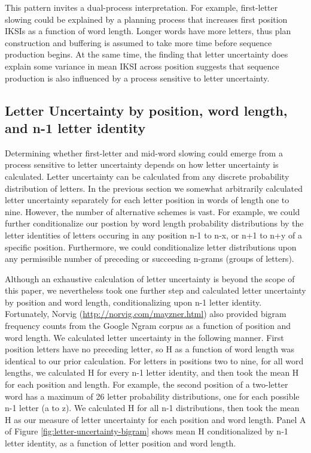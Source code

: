 \documentclass[floatsintext,man]{apa6}
\theoremstyle{definition}
\theoremstyle{definition}
\theoremstyle{definition}
\theoremstyle{remark}
\begin{document}
This pattern invites a dual-process interpretation. For example,
first-letter slowing could be explained by a planning process that
increases first position IKSIs as a function of word length. Longer
words have more letters, thus plan construction and buffering is assumed
to take more time before sequence production begins. At the same time,
the finding that letter uncertainty does explain some variance in mean
IKSI across position suggests that sequence production is also
influenced by a process sensitive to letter uncertainty.

\subsection{Letter Uncertainty by position, word length, and n-1 letter
identity}\label{letter-uncertainty-by-position-word-length-and-n-1-letter-identity}

Determining whether first-letter and mid-word slowing could emerge from
a process sensitive to letter uncertainty depends on how letter
uncertainty is calculated. Letter uncertainty can be calculated from any
discrete probability distribution of letters. In the previous section we
somewhat arbitrarily calculated letter uncertainty separately for each
letter position in words of length one to nine. However, the number of
alternative schemes is vast. For example, we could further
conditionalize our postion by word length probability distributions by
the letter identities of letters occuring in any position n-1 to n-x, or
n+1 to n+y of a specific position. Furthermore, we could conditionalize
letter distributions upon any permissible number of preceding or
succeeding n-grams (groups of letters).

Although an exhaustive calculation of letter uncertainty is beyond the
scope of this paper, we nevertheless took one further step and
calculated letter uncertainty by position and word length,
conditionalizing upon n-1 letter identity. Fortunately, Norvig
(\url{http://norvig.com/mayzner.html}) also provided bigram frequency
counts from the Google Ngram corpus as a function of position and word
length. We calculated letter uncertainty in the following manner. First
position letters have no preceding letter, so H as a function of word
length was identical to our prior calculation. For letters in positions
two to nine, for all word lengths, we calculated H for every n-1 letter
identity, and then took the mean H for each position and length. For
example, the second position of a two-letter word has a maximum of 26
letter probability distributions, one for each possible n-1 letter (a to
z). We calculated H for all n-1 distributions, then took the mean H as
our measure of letter uncertainty for each position and word length.
Panel A of Figure \ref{fig:letter-uncertainty-bigram} shows mean H
conditionalized by n-1 letter identity, as a function of letter position
and word length.
\end{document}
